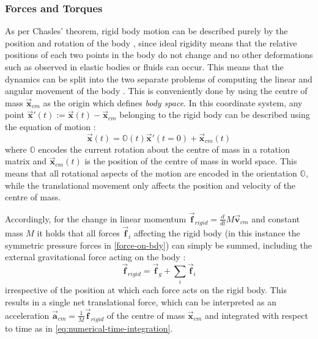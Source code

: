 \documentclass[oneside, a4paper]{book}
\newcommand\vek[1]{\vec{\bm{#1}}}
\begin{document}
    \subsubsection{Forces and Torques}
    As per Chasles' theorem, rigid body motion can be described purely by the position and rotation of the body \autocite{classical-mechanics}, since ideal rigidity means that the relative positions of each two points in the body do not change and no other deformations such as observed in elastic bodies or fluids can occur. This means that the dynamics can be split into the two separate problems of computing the linear and angular movement of the body \autocite{classical-mechanics}. This is conveniently done by using the centre of mass $\vek{x}_{cm}$ as the origin which defines \textit{body space}. In this coordinate system, any point $\vek{x}'(t) := \vek{x}(t) - \vek{x}_{cm} $ belonging to the rigid body can be described using the equation of motion \autocite{physically-based-rigids}:
    \begin{equation}\label{eq:rigid-body-equation-of-motion}
      \vek{x}(t) = \mathds{O}(t)\vek{x}'(t=0) + \vek{x}_{cm}(t)
    \end{equation}
    where $\mathds{O}$ encodes the current rotation about the centre of mass in a rotation matrix and $\vek{x}_{cm}(t)$ is the position of the centre of mass in world space. This means that all rotational aspects of the motion are encoded in the orientation $\mathds{O}$, while the translational movement only affects the position and velocity of the centre of mass. 
    
    Accordingly, for the change in linear momentum $\vek{f}_{rigid} = \frac{d}{dt} M\vek{v}_{cm}$ and constant mass $M$ it holds that all forces $\vek{f}_i$ affecting the rigid body (in this instance the symmetric pressure forces in \autoref{force-on-bdy}) can simply be summed, including the external gravitational force acting on the body \autocite{physically-based-rigids}:
    \begin{equation}\label{eq:f-rigid}
      \vek{f}_{rigid} = \vek{f}_g + \sum_i \vek{f}_i
    \end{equation}
    irrespective of the position at which each force acts on the rigid body. This results in a single net translational force, which can be interpreted as an acceleration $\vek{a}_{cm} = \frac{1}{M}\vek{f}_{rigid}$ of the centre of mass $\vek{x}_{cm}$ and integrated with respect to time as in \autoref{eq:numerical-time-integration}.
\end{document}
